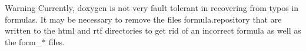 \begin{DoxyWarning}{Warning}
Currently, doxygen is not very fault tolerant in recovering from typos in formulas. It may be necessary to remove the files {\ttfamily formula.\+repository} that are written to the html and rtf directories to get rid of an incorrect formula as well as the {\ttfamily form\+\_\+$\ast$} files.
\end{DoxyWarning}
 